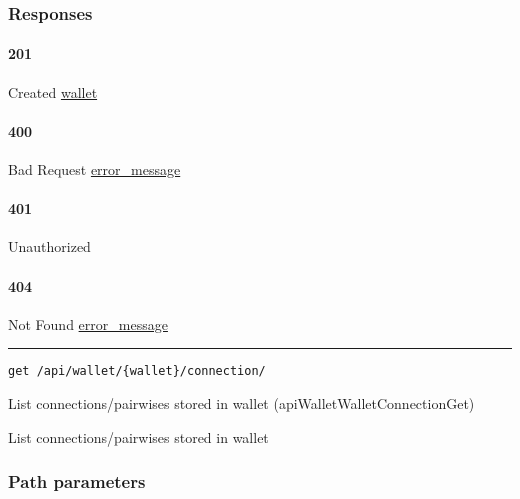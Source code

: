 \hypertarget{responses-85}{%
\subsubsection{Responses}\label{responses-85}}

\hypertarget{section-277}{%
\paragraph{201}\label{section-277}}

Created \protect\hyperlink{wallet}{wallet}

\hypertarget{section-278}{%
\paragraph{400}\label{section-278}}

Bad Request \protect\hyperlink{error_message}{error\_message}

\hypertarget{section-279}{%
\paragraph{401}\label{section-279}}

Unauthorized \protect\hyperlink{}{}

\hypertarget{section-280}{%
\paragraph{404}\label{section-280}}

Not Found \protect\hyperlink{error_message}{error\_message}

\begin{center}\rule{0.5\linewidth}{\linethickness}\end{center}

\protect\hypertarget{apiWalletWalletConnectionGet}{}{}

\begin{verbatim}
get /api/wallet/{wallet}/connection/
\end{verbatim}

List connections/pairwises stored in wallet
({apiWalletWalletConnectionGet})

List connections/pairwises stored in wallet

\hypertarget{path-parameters-42}{%
\subsubsection{Path parameters}\label{path-parameters-42}}

